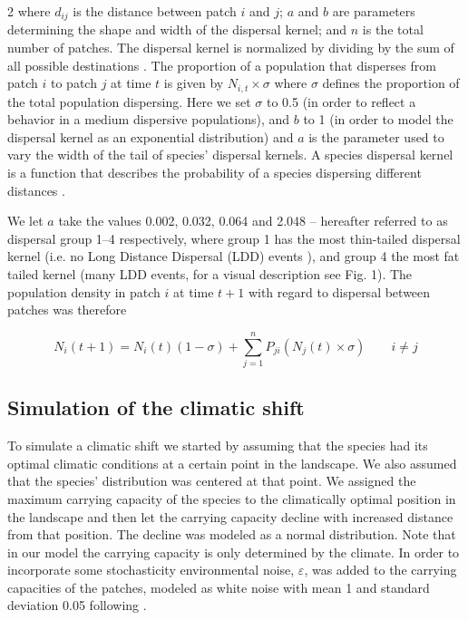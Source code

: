 \documentclass[12pt,pdftex]{article}
\begin{document}
\begin{spacing}{2}
where $d_{ij}$ is the distance between patch $i$ and $j$; $a$ and $b$ are parameters determining the shape and width of the dispersal kernel; and $n$ is the total number of patches. The dispersal kernel is normalized by dividing by the sum of all possible destinations \citep{Lindstrom2009}. The proportion of a population that disperses from patch $i$ to patch $j$ at time $t$ is given by $N_{i,t} \times \sigma$ where $\sigma$ defines the proportion of the total population dispersing. Here we set $\sigma$ to 0.5 (in order to reflect a behavior in a medium dispersive populations), and $b$ to 1 (in order to model the dispersal kernel as an exponential distribution) and $a$ is the parameter used to vary the width of the tail of species' dispersal kernels. A species dispersal kernel is a function that describes the probability of a species dispersing different distances \citep{Nathan2006}.

 We let $a$ take the values 0.002, 0.032, 0.064 and 2.048 -- hereafter referred to as dispersal group 1--4 respectively, where group 1 has the most thin-tailed dispersal kernel (i.e. no Long Distance Dispersal (LDD) events \citep{Nathan2006, Hovestadt2001}), and group 4 the most fat tailed kernel (many LDD events, for a visual description see Fig. 1).  The population density in patch $i$ at time $t+1$ with regard to dispersal between patches was therefore 

\begin{equation}
	N_{i}(t+1)=N_{i}(t)  (1- \sigma)  + \sum_{j=1}^{n}P_{ji}(N_{j}(t) \times \sigma) \qquad i\neq j
\end{equation}


\subsection*{Simulation of the climatic shift} 
To simulate a climatic shift we started by assuming that the species had its optimal climatic conditions at a certain point in the landscape. We also assumed that the species’ distribution was centered at that point. We assigned the maximum carrying capacity of the species to the climatically optimal position in the landscape and then let the carrying capacity decline with increased distance from that position. The decline was modeled as a normal distribution.  Note that in our model the carrying capacity is only determined by the climate. In order to incorporate some stochasticity environmental noise, $\varepsilon$, was added to the carrying capacities of the patches, modeled as white noise with mean 1 and standard deviation 0.05 following \cite{Logdberg2012}.


\end{spacing}
\end{document}

